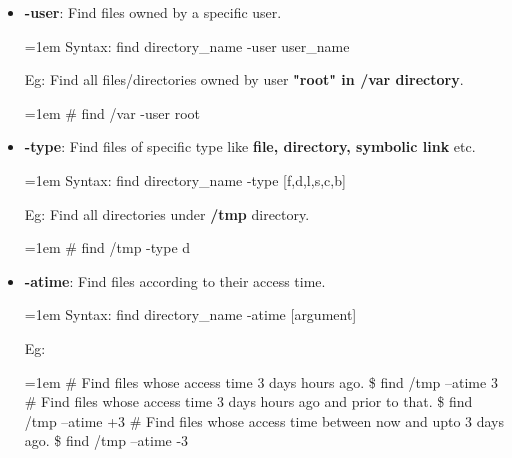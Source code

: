 \begin{flushleft}
\begin{itemize}
\begin{itemize}
			
			\item \textbf{-user}: Find files owned by a specific user.
			\bigskip
			\begin{tcolorbox}[breakable,notitle,boxrule=-0pt,colback=pink,colframe=pink]
				\color{black}
				\font=1em
				Syntax: find directory\_name -user user\_name
				\font=4pt
			\end{tcolorbox}
			\bigskip
			Eg: Find all files/directories owned by user \textbf{"root" in /var directory}.
			\bigskip
			\begin{tcolorbox}[breakable,notitle,boxrule=-0pt,colback=black,colframe=black]
				\color{green}
				\font=1em
				\# find /var -user root
				\font=4pt
			\end{tcolorbox}		
			
			\item \textbf{-type}: Find files of specific type like \textbf{file, directory, symbolic link} etc.
			\bigskip
			\begin{tcolorbox}[breakable,notitle,boxrule=-0pt,colback=pink,colframe=pink]
				\color{black}
				\font=1em
				Syntax: find directory\_name -type [f,d,l,s,c,b]
				\font=4pt
			\end{tcolorbox}
			\bigskip
			Eg: Find all directories under \textbf{/tmp} directory.
			\bigskip
			\begin{tcolorbox}[breakable,notitle,boxrule=-0pt,colback=black,colframe=black]
				\color{green}
				\font=1em
				\# find /tmp -type d
				\font=4pt
			\end{tcolorbox}		
			
			\item \textbf{-atime}: Find files according to their access time.
			\bigskip
			\begin{tcolorbox}[breakable,notitle,boxrule=-0pt,colback=pink,colframe=pink]
				\color{black}
				\font=1em
				Syntax: find directory\_name -atime [argument]
				\font=4pt
			\end{tcolorbox}
			\bigskip
			Eg:
			\bigskip
			\begin{tcolorbox}[breakable,notitle,boxrule=-0pt,colback=black,colframe=black]
				\color{yellow}
				\font=1em
				\# Find files whose access time 3 days hours ago.
				\color{green}
				\newline
				\$ find /tmp –atime 3 
				\newline
				\newline				
				\color{yellow}
				\# Find files whose access time 3 days hours ago and prior to that.
				\color{green}
				\newline
				\$ find /tmp –atime +3 
				\newline
				\color{yellow}
				\newline
				\# Find files whose access time between now and upto 3 days ago.
				\color{green}
				\newline
				\$ find /tmp –atime -3 
				\font=4pt
			\end{tcolorbox}		
			

\end{itemize}
\end{itemize}
\end{flushleft}
